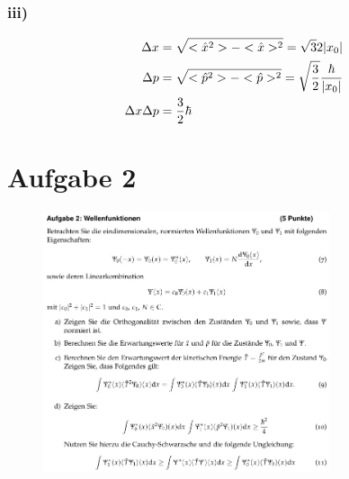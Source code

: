 \subsubsection{iii)}

\begin{align}
\Delta x&= \sqrt{<\hat x ^2>-<\hat x>^2 } =\sqrt{3}{2} \lvert x_0\rvert\\
\Delta p &= \sqrt{<\hat p ^2>-<\hat p >^2} =\sqrt{\frac{3}{2}}\frac{\hbar}{\lvert x_0\rvert}\\
\Delta x \Delta p &= \frac{3}{2} \hbar 
\end{align}

%
%
%



\section{Aufgabe 2}

\begin{figure}[H]
    \centering
    \includegraphics[width=0.75\textwidth]{images/Aufgabe_2.jpg}
    \label{fig:2}
\end{figure}

